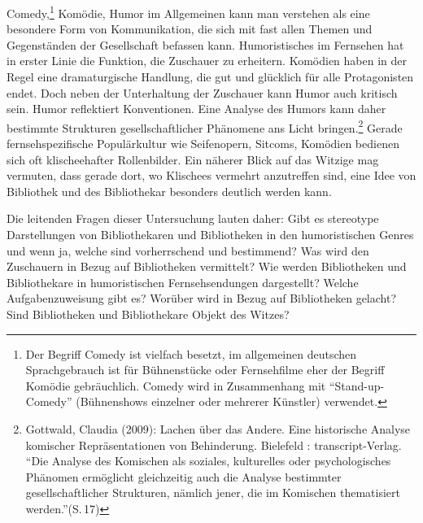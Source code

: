 Comedy,\footnote{Der Begriff Comedy ist vielfach besetzt, im allgemeinen
  deutschen Sprachgebrauch ist für Bühnenstücke oder Fernsehfilme eher
  der Begriff Komödie gebräuchlich. Comedy wird in Zusammenhang mit
  \enquote{Stand-up-Comedy} (Bühnenshows einzelner oder mehrerer
  Künstler) verwendet.} Komödie, Humor im Allgemeinen kann man verstehen
als eine besondere Form von Kommunikation, die sich mit fast allen
Themen und Gegenständen der Gesellschaft befassen kann. Humoristisches
im Fernsehen hat in erster Linie die Funktion, die Zuschauer zu
erheitern. Komödien haben in der Regel eine dramaturgische Handlung, die
gut und glücklich für alle Protagonisten endet. Doch neben der
Unterhaltung der Zuschauer kann Humor auch kritisch sein. Humor
reflektiert Konventionen. Eine Analyse des Humors kann daher bestimmte
Strukturen gesellschaftlicher Phänomene ans Licht bringen.\footnote{Gottwald,
  Claudia (2009): Lachen über das Andere. Eine historische Analyse
  komischer Repräsentationen von Behinderung. Bielefeld :
  transcript-Verlag. \enquote{Die Analyse des Komischen als soziales,
  kulturelles oder psychologisches Phänomen ermöglicht gleichzeitig auch
  die Analyse bestimmter gesellschaftlicher Strukturen, nämlich jener,
  die im Komischen thematisiert werden.}(S.\,17)} Gerade
fernsehspezifische Populärkultur wie Seifenopern, Sitcoms, Komödien
bedienen sich oft klischeehafter Rollenbilder. Ein näherer Blick auf das
Witzige mag vermuten, dass gerade dort, wo Klischees vermehrt
anzutreffen sind, eine Idee von Bibliothek und des Bibliothekar
besonders deutlich werden kann.

Die leitenden Fragen dieser Untersuchung lauten daher: Gibt es
stereotype Darstellungen von Bibliothekaren und Bibliotheken in den
humoristischen Genres und wenn ja, welche sind vorherrschend und
bestimmend? Was wird den Zuschauern in Bezug auf Bibliotheken
vermittelt? Wie werden Bibliotheken und Bibliothekare in humoristischen
Fernsehsendungen dargestellt? Welche Aufgabenzuweisung gibt es? Worüber
wird in Bezug auf Bibliotheken gelacht? Sind Bibliotheken und
Bibliothekare Objekt des Witzes?

